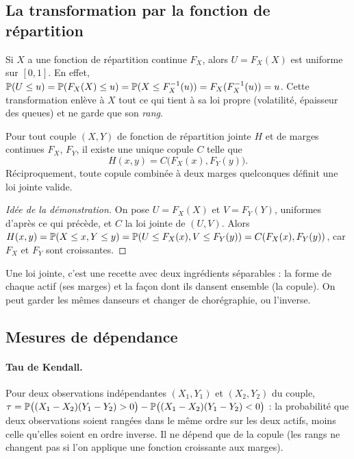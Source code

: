 \subsection{La transformation par la fonction de répartition}

Si $X$ a une fonction de répartition continue $F_X$, alors $U = F_X(X)$ est uniforme sur $[0,1]$. En effet, $\mathbb{P}(U\le u) = \mathbb{P}(F_X(X)\le u) = \mathbb{P}(X\le F_X^{-1}(u)) = F_X(F_X^{-1}(u)) = u$. Cette transformation enlève à $X$ tout ce qui tient à sa loi propre (volatilité, épaisseur des queues) et ne garde que son \emph{rang}.

\begin{theorem}[Sklar]\label{c9:thm:sklar}
Pour tout couple $(X,Y)$ de fonction de répartition jointe $H$ et de marges continues $F_X$, $F_Y$, il existe une unique copule $C$ telle que
\[
H(x,y) = C\big(F_X(x), F_Y(y)\big).
\]
Réciproquement, toute copule combinée à deux marges quelconques définit une loi jointe valide.
\end{theorem}
\begin{proof}[Idée de la démonstration]
On pose $U = F_X(X)$ et $V = F_Y(Y)$, uniformes d'après ce qui précède, et $C$ la loi jointe de $(U,V)$. Alors $H(x,y) = \mathbb{P}(X\le x, Y\le y) = \mathbb{P}(U\le F_X(x), V\le F_Y(y)) = C(F_X(x),F_Y(y))$, car $F_X$ et $F_Y$ sont croissantes.
\end{proof}

\begin{intuition}
Une loi jointe, c'est une recette avec deux ingrédients séparables : la \og forme\fg{} de chaque actif (ses marges) et la \og façon dont ils dansent ensemble\fg{} (la copule). On peut garder les mêmes danseurs et changer de chorégraphie, ou l'inverse.
\end{intuition}

\subsection{Mesures de dépendance}

\paragraph{Tau de Kendall.} Pour deux observations indépendantes $(X_1,Y_1)$ et $(X_2,Y_2)$ du couple, $\tau = \mathbb{P}\big((X_1-X_2)(Y_1-Y_2)>0\big) - \mathbb{P}\big((X_1-X_2)(Y_1-Y_2)<0\big)$ : la probabilité que deux observations soient rangées dans le même ordre sur les deux actifs, moins celle qu'elles soient en ordre inverse. Il ne dépend que de la copule (les rangs ne changent pas si l'on applique une fonction croissante aux marges).


